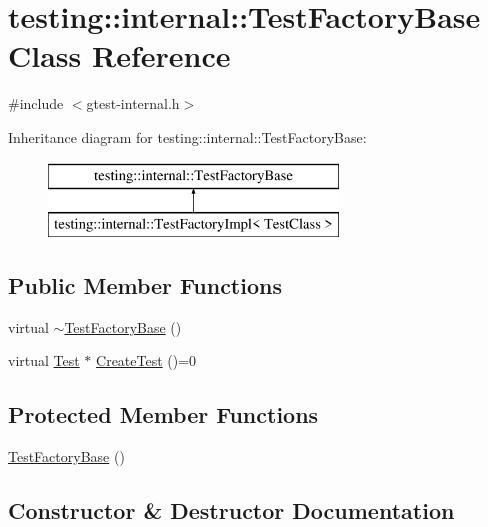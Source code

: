 \hypertarget{classtesting_1_1internal_1_1_test_factory_base}{}\section{testing\+::internal\+::Test\+Factory\+Base Class Reference}
\label{classtesting_1_1internal_1_1_test_factory_base}


{\ttfamily \#include $<$gtest-\/internal.\+h$>$}

Inheritance diagram for testing\+::internal\+::Test\+Factory\+Base\+:\begin{figure}[H]
\begin{center}
\leavevmode
\includegraphics[height=2.000000cm]{classtesting_1_1internal_1_1_test_factory_base}
\end{center}
\end{figure}
\subsection*{Public Member Functions}
\begin{DoxyCompactItemize}
\item 
virtual \mbox{\hyperlink{classtesting_1_1internal_1_1_test_factory_base_a18f22a7594336a36642289c1decddc9e}{$\sim$\+Test\+Factory\+Base}} ()
\item 
virtual \mbox{\hyperlink{classtesting_1_1_test}{Test}} $\ast$ \mbox{\hyperlink{classtesting_1_1internal_1_1_test_factory_base_a07ac3ca0b196cdb092da0bb186b7c030}{Create\+Test}} ()=0
\end{DoxyCompactItemize}
\subsection*{Protected Member Functions}
\begin{DoxyCompactItemize}
\item 
\mbox{\hyperlink{classtesting_1_1internal_1_1_test_factory_base_afedbf147b2a213517b315880d8c81427}{Test\+Factory\+Base}} ()
\end{DoxyCompactItemize}


\subsection{Constructor \& Destructor Documentation}
\mbox{\label{classtesting_1_1internal_1_1_test_factory_base_a18f22a7594336a36642289c1decddc9e}} 
